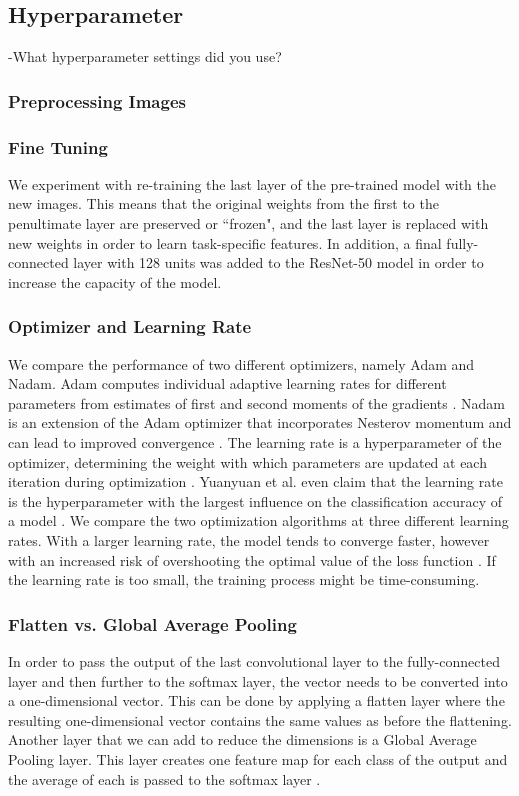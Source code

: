 \documentclass[sn-mathphys,Numbered]{sn-jnl}%
\theoremstyle{thmstyleone}%
\theoremstyle{thmstyletwo}%
\theoremstyle{thmstylethree}%
\begin{document}
\subsection{Hyperparameter}\label{Hyperparameter}
-What hyperparameter settings did you use?
\subsubsection{Preprocessing Images}\label{Preprocessing}
\subsubsection{Fine Tuning}\label{finetuning}
We experiment with re-training the last layer of the pre-trained model with the new images. This means that the original weights from the first to the penultimate layer are preserved or ``frozen", and the last layer is replaced with new weights in order to learn task-specific features. In addition, a final fully-connected layer with 128 units was added to the ResNet-50 model in order to increase the capacity of the model.

\subsubsection{Optimizer and Learning Rate}\label{learningrate}
We compare the performance of two different optimizers, namely Adam and Nadam. Adam computes individual adaptive learning rates for different parameters from estimates of first and second moments of the gradients \cite{kingma2017adam}. Nadam is an extension of the Adam optimizer that incorporates Nesterov momentum and can lead to improved convergence \cite{dozat.2016}.
The learning rate is a hyperparameter of the optimizer, determining the weight with which parameters are updated at each iteration during optimization \cite{Brownlee_2020}.
Yuanyuan et al. even claim that the learning rate is the hyperparameter with the largest influence on the classification accuracy of a model \cite{Yuanyuan_2020}. 
We compare the two optimization algorithms at three different learning rates.
With a larger learning rate, the model tends to converge faster, however with an increased risk of overshooting the optimal value of the loss function \cite{Brownlee_2020}.
If the learning rate is too small, the training process might be time-consuming.
\subsubsection{Flatten vs. Global Average Pooling}\label{fullyConnected}
In order to pass the output of the last convolutional layer to the fully-connected layer and then further to the softmax layer, the vector needs to be converted into a one-dimensional vector. This can be done by applying a flatten layer where the resulting one-dimensional vector contains the same values as before the flattening.\\
Another layer that we can add to reduce the dimensions is a Global Average Pooling layer. This layer creates one feature map for each class of the output and the average of each is passed to the softmax layer \cite{Admin_2023}.
\end{document}
